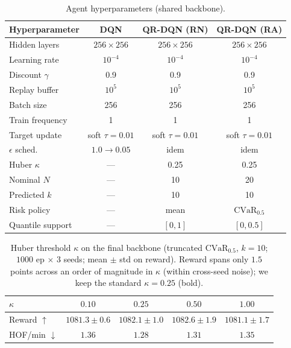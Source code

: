 \documentclass[conference]{IEEEtran}
\begin{document}
\begin{table}[htbp]
\caption{Agent hyperparameters (shared backbone).}
\label{tab:hparams}
\begin{center}
\begin{tabular}{|l|c|c|c|}
\hline
\textbf{Hyperparameter} & \textbf{DQN} & \textbf{QR-DQN (RN)} & \textbf{QR-DQN (RA)} \\
\hline
Hidden layers      & $256\times256$ & $256\times256$ & $256\times256$ \\
Learning rate      & $10^{-4}$ & $10^{-4}$ & $10^{-4}$ \\
Discount $\gamma$  & 0.9 & 0.9 & 0.9 \\
Replay buffer      & $10^5$ & $10^5$ & $10^5$ \\
Batch size         & 256 & 256 & 256 \\
Train frequency    & 1 & 1 & 1 \\
Target update      & soft $\tau{=}0.01$ & soft $\tau{=}0.01$ & soft $\tau{=}0.01$ \\
$\epsilon$ sched.  & $1.0\!\to\!0.05$ & idem & idem \\
Huber $\kappa$     & --- & 0.25 & 0.25 \\
Nominal $N$        & --- & 10 & 20 \\
Predicted $k$      & --- & 10 & 10 \\
Risk policy        & --- & mean & $\mathrm{CVaR}_{0.5}$ \\
Quantile support   & --- & $[0,1]$ & $[0,0.5]$ \\
\hline
\end{tabular}
\end{center}
\end{table}

\begin{table}[htbp]
\caption{Huber threshold $\kappa$ on the final backbone (truncated
$\mathrm{CVaR}_{0.5}$, $k{=}10$; $1000$ ep $\times$ $3$ seeds; mean $\pm$ std on
reward). Reward spans only $1.5$ points across an order of magnitude in
$\kappa$ (within cross-seed noise); we keep the standard $\kappa{=}0.25$ (bold).}
\label{tab:kappa}
\begin{center}
\setlength{\tabcolsep}{4pt}
\begin{tabular}{|l|c|c|c|c|}
\hline
$\kappa$ & $0.10$ & $\mathbf{0.25}$ & $0.50$ & $1.00$ \\
\hline
Reward $\uparrow$    & $1081.3{\pm}0.6$ & $\mathbf{1082.1{\pm}1.0}$ & $1082.6{\pm}1.9$ & $1081.1{\pm}1.7$ \\
HOF/min $\downarrow$ & $1.36$ & $\mathbf{1.28}$ & $1.31$ & $1.35$ \\
\hline
\end{tabular}
\end{center}
\end{table}
\end{document}
